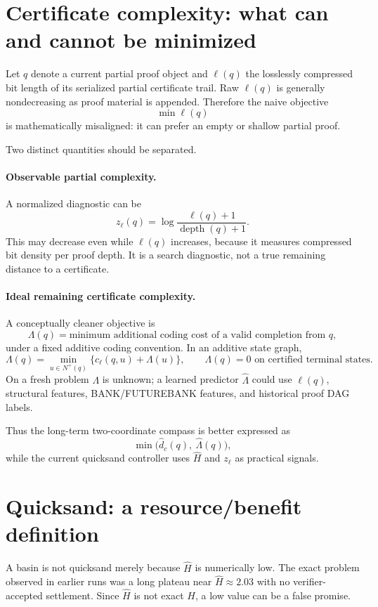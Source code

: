 \documentclass[11pt]{article}
\newcommand{\Hhat}{\widehat H}
\newcommand{\Lamhat}{\widehat\Lambda}
\begin{document}
\section{Certificate complexity: what can and cannot be minimized}

Let $q$ denote a current partial proof object and $\ell(q)$ the losslessly compressed bit length of its serialized partial certificate trail. Raw $\ell(q)$ is generally nondecreasing as proof material is appended. Therefore the naive objective
\[
\min\ell(q)
\]
is mathematically misaligned: it can prefer an empty or shallow partial proof.

Two distinct quantities should be separated.

\paragraph{Observable partial complexity.}
A normalized diagnostic can be
\[
z_\ell(q)=\log\frac{\ell(q)+1}{\operatorname{depth}(q)+1}.
\]
This may decrease even while $\ell(q)$ increases, because it measures compressed bit density per proof depth. It is a search diagnostic, not a true remaining distance to a certificate.

\paragraph{Ideal remaining certificate complexity.}
A conceptually cleaner objective is
\[
\Lambda(q)=\text{minimum additional coding cost of a valid completion from $q$},
\]
under a fixed additive coding convention. In an additive state graph,
\[
\Lambda(q)=\min_{u\in N^+(q)}\{c_\ell(q,u)+\Lambda(u)\},
\qquad \Lambda(q)=0\text{ on certified terminal states}.
\]
On a fresh problem $\Lambda$ is unknown; a learned predictor $\Lamhat$ could use $\ell(q)$, structural features, BANK/FUTUREBANK features, and historical proof DAG labels.

Thus the long-term two-coordinate compass is better expressed as
\[
\min \bigl(\widehat d_c(q),\ \Lamhat(q)\bigr),
\]
while the current quicksand controller uses $\Hhat$ and $z_\ell$ as practical signals.

\section{Quicksand: a resource/benefit definition}

A basin is not quicksand merely because $\Hhat$ is numerically low. The exact problem observed in earlier runs was a long plateau near $\Hhat\approx2.03$ with no verifier-accepted settlement. Since $\Hhat$ is not exact $H$, a low value can be a false promise.
\end{document}
